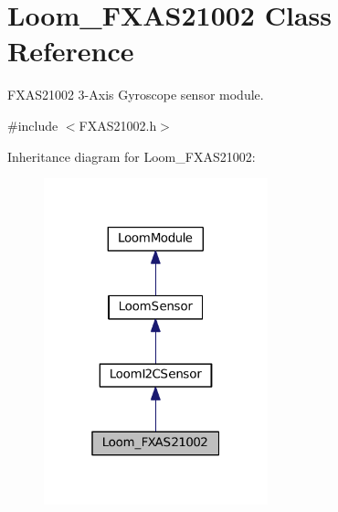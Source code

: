 \hypertarget{class_loom___f_x_a_s21002}{}\section{Loom\+\_\+\+F\+X\+A\+S21002 Class Reference}
\label{class_loom___f_x_a_s21002}


F\+X\+A\+S21002 3-\/\+Axis Gyroscope sensor module.  




{\ttfamily \#include $<$F\+X\+A\+S21002.\+h$>$}



Inheritance diagram for Loom\+\_\+\+F\+X\+A\+S21002\+:\nopagebreak
\begin{figure}[H]
\begin{center}
\leavevmode
\includegraphics[width=184pt]{class_loom___f_x_a_s21002__inherit__graph}
\end{center}
\end{figure}
